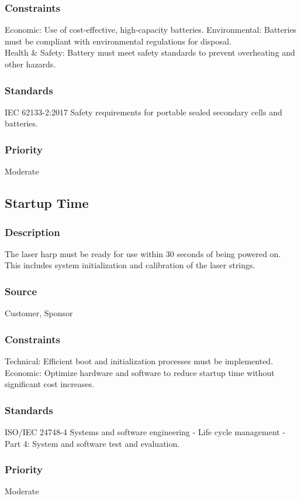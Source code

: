 \subsubsection{Constraints}
Economic: Use of cost-effective, high-capacity batteries.
Environmental: Batteries must be compliant with environmental regulations for disposal.\\
Health & Safety: Battery must meet safety standards to prevent overheating and other hazards.
\subsubsection{Standards}
IEC 62133-2:2017 Safety requirements for portable sealed secondary cells and batteries.
\subsubsection{Priority}
Moderate


\subsection{Startup Time}
\subsubsection{Description}
The laser harp must be ready for use within 30 seconds of being powered on. This includes system initialization and calibration of the laser strings.
\subsubsection{Source}
Customer, Sponsor
\subsubsection{Constraints}
Technical: Efficient boot and initialization processes must be implemented.\\
Economic: Optimize hardware and software to reduce startup time without significant cost increases.
\subsubsection{Standards}
ISO/IEC 24748-4 Systems and software engineering - Life cycle management - Part 4: System and software test and evaluation.
\subsubsection{Priority}
Moderate


